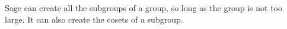 Sage can create all the subgroups of a group, so long as the group is not too large.  It can also create the cosets of a subgroup.